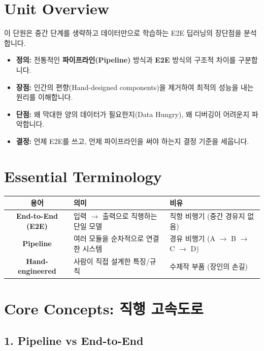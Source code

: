 \documentclass[11pt,a4paper]{book}
\theoremstyle{definition}
\begin{document}
\section{Unit Overview}
\begin{summarybox}[title={핵심 목표}]
이 단원은 중간 단계를 생략하고 데이터만으로 학습하는 E2E 딥러닝의 장단점을 분석합니다.
\begin{itemize}
    \item \textbf{정의:} 전통적인 \textbf{파이프라인(Pipeline)} 방식과 \textbf{E2E} 방식의 구조적 차이를 구분합니다.
    \item \textbf{장점:} 인간의 편향(Hand-designed components)을 제거하여 최적의 성능을 내는 원리를 이해합니다.
    \item \textbf{단점:} 왜 막대한 양의 데이터가 필요한지(Data Hungry), 왜 디버깅이 어려운지 파악합니다.
    \item \textbf{결정:} 언제 E2E를 쓰고, 언제 파이프라인을 써야 하는지 결정 기준을 세웁니다.
\end{itemize}
\end{summarybox}

\section{Essential Terminology}
\begin{center}
\begin{tabular}{|c|l|l|}
\hline
\textbf{용어} & \textbf{의미} & \textbf{비유} \\ \hline
\textbf{End-to-End (E2E)} & 입력 $\to$ 출력으로 직행하는 단일 모델 & 직항 비행기 (중간 경유지 없음) \\ \hline
\textbf{Pipeline} & 여러 모듈을 순차적으로 연결한 시스템 & 경유 비행기 (A $\to$ B $\to$ C $\to$ D) \\ \hline
\textbf{Hand-engineered} & 사람이 직접 설계한 특징/규칙 & 수제작 부품 (장인의 손길) \\ \hline
\end{tabular}
\end{center}

\section{Core Concepts: 직행 고속도로}

\subsection{1. Pipeline vs End-to-End}
\end{document}
